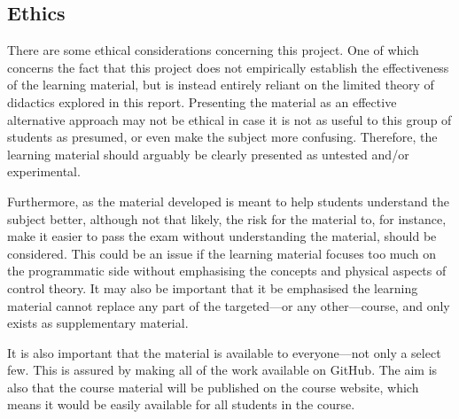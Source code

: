 \subsection{Ethics}
There are some ethical considerations concerning this project. %
One of which concerns the fact that this project does not empirically establish the effectiveness of the learning material, but is instead entirely reliant on the limited theory of didactics explored in this report. Presenting the material as an effective alternative approach may not be ethical in case it is not as useful to this group of students as presumed, or even make the subject more confusing. Therefore, the learning material should arguably be clearly presented as untested and/or experimental.

Furthermore, as the material developed is meant to help students understand the subject better, although not that likely, the risk for the material to, for instance, make it easier to pass the exam without understanding the material, should be considered.
This could be an issue if the learning material focuses too much on the programmatic side without emphasising the concepts and physical aspects of control theory. It may also be important that it be emphasised the learning material cannot replace any part of the targeted---or any other---course, and only exists as supplementary material.

It is also important that the material is available to everyone---not only a select few. This is assured by making all of the work available on GitHub. The aim is also that the course material will be published on the course website, which means it would be easily available for all students in the course.

